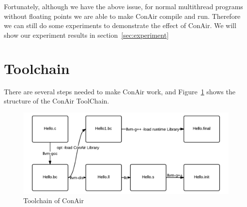 Fortunately, although we have the above issue, for normal multithread programs
without floating points we are able to make ConAir compile and run. Therefore we
can still do some experiments to demonstrate the effect of ConAir. We will show
our experiment results in section~\ref{sec:experiment}

\section{Toolchain}
There are several steps needed to make ConAir work, and
Figure~\ref{fig:toolchain} shows the structure of the ConAir ToolChain.
\begin{figure}
\centering
\includegraphics[width=\textwidth]{body/toolchain.png}
\caption{Toolchain of ConAir}
\label{fig:toolchain}
\end{figure}

